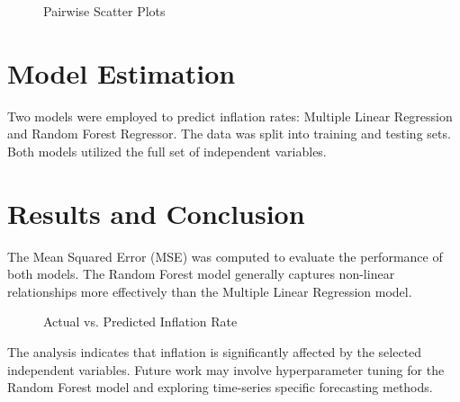 \documentclass[12pt]{article}
\begin{document}
\begin{figure}[H]
\caption{Pairwise Scatter Plots}
\end{figure}

\section{Model Estimation}
Two models were employed to predict inflation rates: Multiple Linear Regression and Random Forest Regressor. The data was split into training and testing sets. Both models utilized the full set of independent variables.

\section{Results and Conclusion}
The Mean Squared Error (MSE) was computed to evaluate the performance of both models. The Random Forest model generally captures non-linear relationships more effectively than the Multiple Linear Regression model.
\begin{figure}[H]
\caption{Actual vs. Predicted Inflation Rate}
\end{figure}

The analysis indicates that inflation is significantly affected by the selected independent variables. Future work may involve hyperparameter tuning for the Random Forest model and exploring time-series specific forecasting methods.
\end{document}
